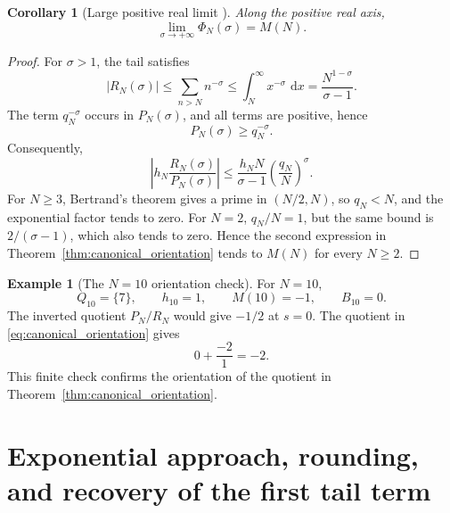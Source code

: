 \documentclass[11pt]{amsart}
\numberwithin{equation}{section}
\theoremstyle{plain}
\newtheorem{corollary}[theorem]{Corollary}
\theoremstyle{definition}
\newtheorem{example}[theorem]{Example}
\theoremstyle{remark}
\newcommand{\1}{\mathbf{1}}
\newcommand{\dd}{\,\mathrm{d}}
\begin{document}
\begin{corollary}[Large positive real limit {}]
\label{cor:Phi_infinity}
Along the positive real axis,
\begin{equation}
\boxed{
\lim_{\sigma\to+\infty}\Phi_N(\sigma)=M(N).
}
\label{eq:Phi_infinity}
\end{equation}
\end{corollary}

\begin{proof}
For \(\sigma>1\), the tail satisfies
\begin{equation}
|R_N(\sigma)|
\leq
\sum_{n>N}n^{-\sigma}
\leq
\int_N^\infty x^{-\sigma}\,\dd x
=
\frac{N^{1-\sigma}}{\sigma-1}.
\label{eq:infinity_tail_bound}
\end{equation}
The term \(q_N^{-\sigma}\) occurs in \(P_N(\sigma)\), and all terms are
positive, hence
\begin{equation}
P_N(\sigma)\geq q_N^{-\sigma}.
\label{eq:infinity_denominator_bound}
\end{equation}
Consequently,
\begin{equation}
\left|h_N\frac{R_N(\sigma)}{P_N(\sigma)}\right|
\leq
\frac{h_NN}{\sigma-1}
\left(\frac{q_N}{N}\right)^\sigma.
\label{eq:infinity_ratio_bound}
\end{equation}
For \(N\geq3\), Bertrand's theorem gives a prime in \((N/2,N)\), so
\(q_N<N\), and the exponential factor tends to zero.  For \(N=2\),
\(q_N/N=1\), but the same bound is \(2/(\sigma-1)\), which also tends to
zero.  Hence the second expression in
Theorem~\ref{thm:canonical_orientation} tends to \(M(N)\) for every
\(N\geq2\).
\end{proof}

\begin{example}[The \(N=10\) orientation check]
\label{exp:N10_orientation}
For \(N=10\),
\begin{equation}
Q_{10}=\{7\},
\qquad
h_{10}=1,
\qquad
M(10)=-1,
\qquad
B_{10}=0.
\label{eq:N10_data}
\end{equation}
The inverted quotient \(P_N/R_N\) would give \(-1/2\) at \(s=0\).
The quotient in \eqref{eq:canonical_orientation} gives
\begin{equation}
0+\frac{-2}{1}=-2.
\label{eq:N10_correct_value}
\end{equation}
This finite check confirms the orientation of the quotient in Theorem~\ref{thm:canonical_orientation}.
\end{example}

\section{Exponential approach, rounding, and recovery of the first tail term}
\label{sec:asymptotic_recovery}
\end{document}
